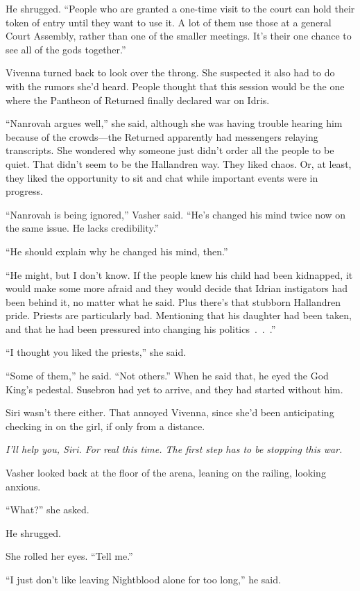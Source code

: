 He shrugged. “People who are granted a one-time visit to the court can hold their token of entry until they want to use it. A lot of them use those at a general Court Assembly, rather than one of the smaller meetings. It’s their one chance to see all of the gods together.”

Vivenna turned back to look over the throng. She suspected it also had to do with the rumors she’d heard. People thought that this session would be the one where the Pantheon of Returned finally declared war on Idris.

“Nanrovah argues well,” she said, although she was having trouble hearing him because of the crowds—the Returned apparently had messengers relaying transcripts. She wondered why someone just didn’t order all the people to be quiet. That didn’t seem to be the Hallandren way. They liked chaos. Or, at least, they liked the opportunity to sit and chat while important events were in progress.

“Nanrovah is being ignored,” Vasher said. “He’s changed his mind twice now on the same issue. He lacks credibility.”

“He should explain why he changed his mind, then.”

“He might, but I don’t know. If the people knew his child had been kidnapped, it would make some more afraid and they would decide that Idrian instigators had been behind it, no matter what he said. Plus there’s that stubborn Hallandren pride. Priests are particularly bad. Mentioning that his daughter had been taken, and that he had been pressured into changing his politics~.~.~.”

“I thought you liked the priests,” she said.

“Some of them,” he said. “Not others.” When he said that, he eyed the God King’s pedestal. Susebron had yet to arrive, and they had started without him.

Siri wasn’t there either. That annoyed Vivenna, since she’d been anticipating checking in on the girl, if only from a distance.

\textit{I’ll help you, Siri. For real this time. The first step has to be stopping this war.}

Vasher looked back at the floor of the arena, leaning on the railing, looking anxious.

“What?” she asked.

He shrugged.

She rolled her eyes. “Tell me.”

“I just don’t like leaving Nightblood alone for too long,” he said.

